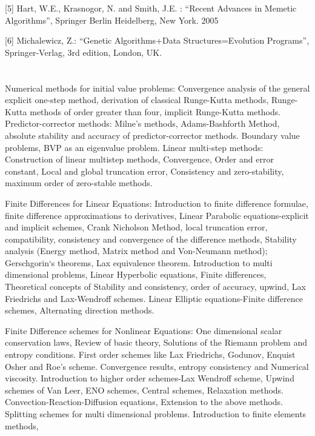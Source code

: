    [5] Hart, W.E., Krasnogor, N. and Smith, J.E. : “Recent Advances in Memetic Algorithms”, Springer Berlin   Heidelberg, New York. 2005 

[6] Michalewicz, Z.: “Genetic Algorithms+Data Structures=Evolution Programs”, Springer-Verlag, 3rd edition, London, UK.


\section{\courseinfo}

Numerical methods for initial value problems: Convergence analysis of the general explicit one-step method, derivation of classical Runge-Kutta methods, Runge-Kutta methods of order greater than four, implicit Runge-Kutta methods. Predictor-corrector methods: Milne’s methods, Adams-Bashforth Method, absolute stability and accuracy of predictor-corrector methods. Boundary value problems, BVP as an eigenvalue problem. Linear multi-step methods: Construction of linear multistep methods, Convergence, Order and error constant, Local and global truncation error, Consistency and zero-stability, maximum order of zero-stable methods. 

Finite Differences for Linear Equations: Introduction to finite difference formulae, finite difference approximations to derivatives, Linear Parabolic equations-explicit and implicit schemes, Crank Nicholson Method, local truncation error, compatibility, consistency and convergence of the difference methods, Stability analysis (Energy method, Matrix method and Von-Neumann method); Gerschgorin‘s theorems, Lax equivalence theorem. Introduction to multi dimensional problems, Linear Hyperbolic equations, Finite differences, Theoretical concepts of Stability and consistency, order of accuracy, upwind, Lax Friedrichs and Lax-Wendroff schemes. Linear Elliptic equations-Finite difference schemes, Alternating direction methods. 

Finite Difference schemes for Nonlinear Equations: One dimensional scalar conservation laws, Review of basic theory, Solutions of the Riemann problem and entropy conditions. First order schemes like Lax Friedrichs, Godunov, Enquist Osher and Roe's scheme. Convergence results, entropy consistency and Numerical viscosity. Introduction to higher order schemes-Lax Wendroff scheme, Upwind schemes of Van Leer, ENO schemes, Central schemes, Relaxation methods. Convection-Reaction-Diffusion equations, Extension to the above methods. Splitting schemes for multi dimensional problems. Introduction to finite elements methods,
 

